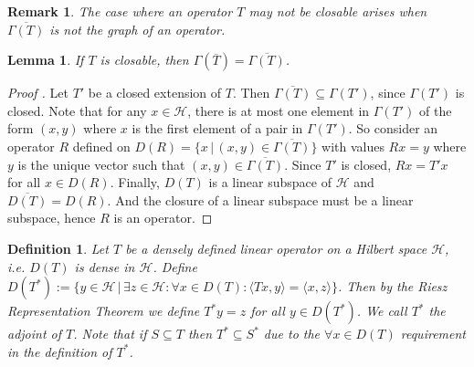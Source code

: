 \documentclass[12pt,oneside]{report}
\newtheorem{lem}[thm]{Lemma}
\newtheorem{defn}[thm]{Definition}
\newtheorem{rem}[thm]{Remark}
\begin{document}
\begin{rem}
    The case where an operator $T$ may not be closable arises when $\overline{\Gamma(T)}$ is not the graph of an operator.
\end{rem}

\begin{lem}
    If $T$ is closable, then $\Gamma(\overline{T}) = \overline{\Gamma(T)}$.
\end{lem}
\begin{proof}[Proof \cite{Reed_Simon_1980}]
    Let $T'$ be a closed extension of $T$. Then $\overline{\Gamma(T)} \subseteq \Gamma(T')$, since $\Gamma(T')$ is closed. Note that for any $x \in \mathscr{H}$, there is at most one element in $\Gamma(T')$ of the form $(x, y)$ where $x$ is the first element of a pair in $\Gamma(T')$. So consider an operator $R$ defined on $D(R) = \{ x \, | \, (x,y) \in \overline{\Gamma(T)} \}$ with values $Rx = y$ where $y$ is the unique vector such that $(x,y) \in \overline{\Gamma(T)}$. Since $T'$ is closed, $Rx = T'x$ for all $x \in D(R)$. Finally, $D(T)$ is a linear subspace of $\mathscr{H}$ and $\overline{D(T)} = D(R)$. And the closure of a linear subspace must be a linear subspace, hence $R$ is an operator.
\end{proof}

\begin{defn}
    Let $T$ be a densely defined linear operator on a Hilbert space $\mathscr{H}$, i.e. $D(T)$ is dense in $\mathscr{H}$. Define $D(T^{*}) := \{ y \in \mathscr{H} \, | \, \exists z \in \mathscr{H}: \forall x \in D(T): \langle Tx,y \rangle = \langle x, z \rangle \}$. Then by the Riesz Representation Theorem we define $T^{*}y = z$ for all $y \in D(T^{*})$. We call $T^{*}$ the adjoint of $T$. Note that if $S \subseteq T$ then $T^{*} \subseteq S^{*}$ due to the $\forall x \in D(T)$ requirement in the definition of $T^{*}$.
\end{defn}
\end{document}
